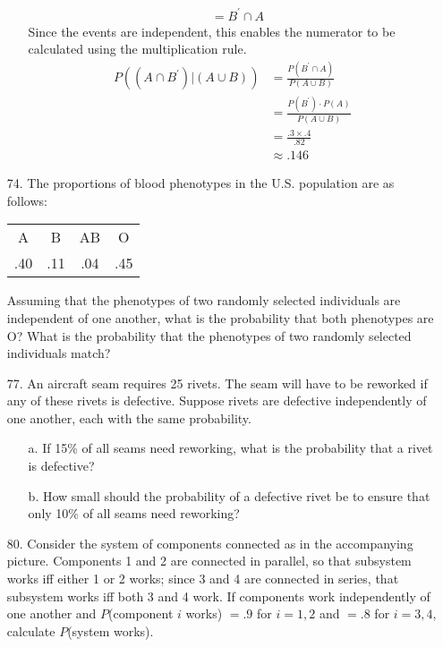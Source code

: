 \documentclass[letterpaper,12pt]{article}
\begin{document}
\begin{enumerate}
\begin{enumerate}
\begin{align*}
          &= B^\prime \cap A
        \end{align*}
        Since the events are independent, this enables the numerator to be calculated using the multiplication rule.
        \begin{align*}
          P((A \cap B^\prime)|(A \cup B)) &= \frac{P(B^\prime \cap A)}{P(A \cup B)} \\
          &= \frac{P(B^\prime) \cdot P(A)}{P(A \cup B)} \\
          &= \frac{.3 \times .4}{.82} \\
          &\approx .146
        \end{align*}
    \end{enumerate}
  \item[74.]
    The proportions of blood phenotypes in the U.S. population are as follows:
    \begin{center}
      \begin{tabular}{cccc}
        A & B & AB & O \\
        .40 & .11 & .04 & .45
      \end{tabular}
    \end{center}
    Assuming that the phenotypes of two randomly selected individuals are independent of one another, what is the probability that both phenotypes are O? What is the probability that the phenotypes of two randomly selected individuals match?
  \item[77.]
    An aircraft seam requires 25 rivets. The seam will have to be reworked if any of these rivets is defective. Suppose rivets are defective independently of one another, each with the same probability.
    \begin{enumerate}
      \item[a.]
        If 15\% of all seams need reworking, what is the probability that a rivet is defective?
      \item[b.]
        How small should the probability of a defective rivet be to ensure that only 10\% of all seams need reworking?
    \end{enumerate}
  \item[80.]
    Consider the system of components connected as in the accompanying picture. Components 1 and 2 are connected in parallel, so that subsystem works iff either 1 or 2 works; since 3 and 4 are connected in series, that subsystem works iff both 3 and 4 work. If components work independently of one another and $P$(component $i$ works) $= .9$ for $i = 1,2$ and $= .8$ for $i = 3,4$, calculate $P$(system works).
    \begin{center}
\end{center}
\end{enumerate}
\end{document}
